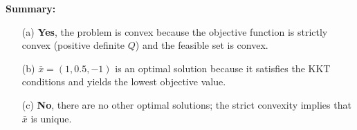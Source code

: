 \documentclass{article}
\begin{document}
\textbf{Summary:}
\begin{itemize}
\item[(a)] \textbf{Yes}, the problem is convex because the objective function is strictly convex (positive definite $Q$) and the feasible set is convex.
\item[(b)] $\bar{x} = (1, 0.5, -1)$ is an optimal solution because it satisfies the KKT conditions and yields the lowest objective value.
\item[(c)] \textbf{No}, there are no other optimal solutions; the strict convexity implies that $\bar{x}$ is unique.
\end{itemize}
\end{document}
